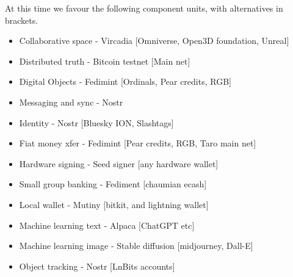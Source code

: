 At this time we favour the following component units, with alternatives in brackets.
\begin{itemize}
\item Collaborative space - Vircadia [Omniverse, Open3D foundation, Unreal]
\item Distributed truth - Bitcoin testnet [Main net]
\item Digital Objects - Fedimint [Ordinals, Pear credits, RGB]
\item Messaging and sync - Nostr 
\item Identity - Nostr [Bluesky ION, Slashtags]
\item Fiat money xfer - Fedimint [Pear credits, RGB, Taro main net]
\item Hardware signing - Seed signer [any hardware wallet]
\item Small group banking - Fediment [chaumian ecash]
\item Local wallet - Mutiny [bitkit, and lightning wallet]
\item Machine learning text - Alpaca [ChatGPT etc]
\item Machine learning image - Stable diffusion [midjourney, Dall-E]
\item Object tracking - Nostr [LnBits accounts]
\end{itemize}

